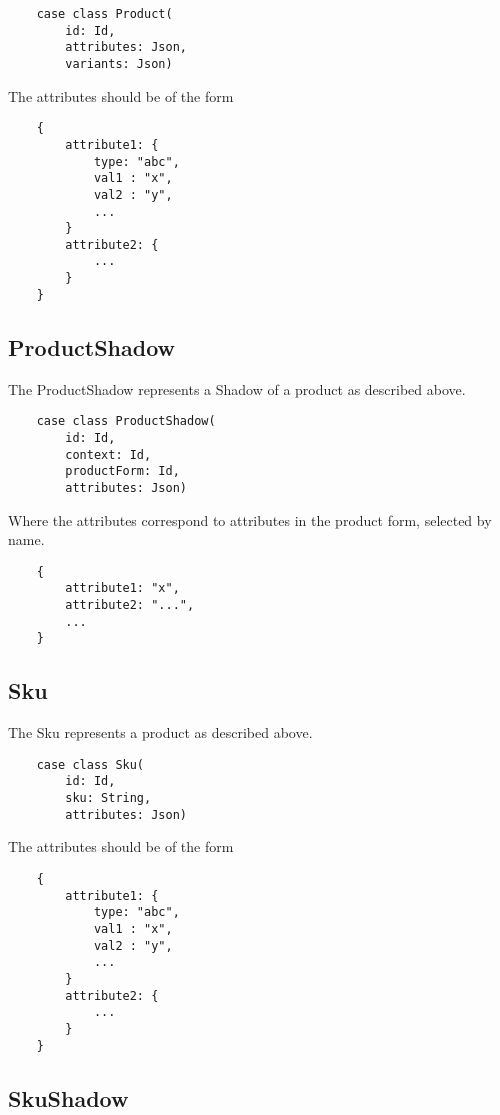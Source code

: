 \documentclass[11pt]{article}
\begin{document}
\begin{lstlisting}
    case class Product(
        id: Id,
        attributes: Json,
        variants: Json)
\end{lstlisting}

The attributes should be of the form
\begin{lstlisting}
    {
        attribute1: {
            type: "abc",
            val1 : "x",
            val2 : "y",
            ...
        }
        attribute2: {
            ...
        }
    }
\end{lstlisting}


\subsection{ProductShadow}

The ProductShadow represents a Shadow of a product as described above. 

\begin{lstlisting}
    case class ProductShadow(
        id: Id,
        context: Id,
        productForm: Id,
        attributes: Json)
\end{lstlisting}

Where the attributes correspond to attributes in the product form, selected by
name.

\begin{lstlisting}
    {
        attribute1: "x",
        attribute2: "...",
        ...
    }
\end{lstlisting}

\subsection{Sku}

The Sku represents a product as described above. 

\begin{lstlisting}
    case class Sku(
        id: Id,
        sku: String,
        attributes: Json)
\end{lstlisting}

The attributes should be of the form
\begin{lstlisting}
    {
        attribute1: {
            type: "abc",
            val1 : "x",
            val2 : "y",
            ...
        }
        attribute2: {
            ...
        }
    }
\end{lstlisting}


\subsection{SkuShadow}
\end{document}
